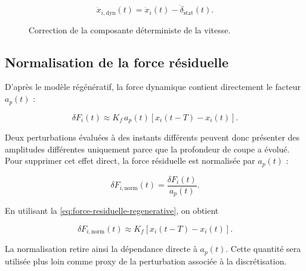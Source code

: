 \documentclass[
    11pt,
    a4paper
]{article}
\begin{document}
\begin{equation}
    \dot{x}_{i,\mathrm{dyn}}(t)
    =
    \dot{x}_i(t)-\dot{\delta}_{\mathrm{stat}}(t).
    \label{eq:vitesse-corrigee}
\end{equation}

\begin{figure}[H]
    \centering
    \caption{Correction de la composante déterministe de la vitesse.}
    \label{fig:vitesse-corrigee}
\end{figure}

\subsection{Normalisation de la force résiduelle}
\label{subsec:normalisation-force}

D'après le modèle régénératif, la force dynamique contient directement le
facteur \(a_p(t)\) :

\begin{equation}
    \delta F_i(t)
    \approx
    K_f\,a_p(t)
    \left[
        x_i(t-T)-x_i(t)
    \right].
    \label{eq:force-residuelle-regenerative}
\end{equation}

Deux perturbations évaluées à des instants différents peuvent donc présenter
des amplitudes différentes uniquement parce que la profondeur de coupe a
évolué. Pour supprimer cet effet direct, la force résiduelle est normalisée par
\(a_p(t)\) :

\begin{equation}
    \delta F_{i,\mathrm{norm}}(t)
    =
    \frac{\delta F_i(t)}{a_p(t)}.
    \label{eq:force-normalisee}
\end{equation}

En utilisant la \ref{eq:force-residuelle-regenerative}, on obtient

\begin{equation}
    \delta F_{i,\mathrm{norm}}(t)
    \approx
    K_f
    \left[
        x_i(t-T)-x_i(t)
    \right].
    \label{eq:force-normalisee-regenerative}
\end{equation}

La normalisation retire ainsi la dépendance directe à \(a_p(t)\). Cette quantité
sera utilisée plus loin comme proxy de la perturbation associée à la
discrétisation.
\end{document}
